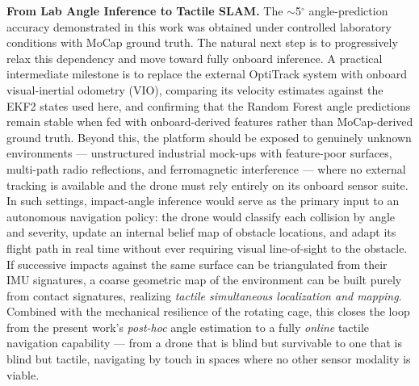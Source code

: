 \textbf{From Lab Angle Inference to Tactile SLAM.} The $\sim$5$^\circ$ angle-prediction accuracy demonstrated in this work was obtained under controlled laboratory conditions with MoCap ground truth. The natural next step is to progressively relax this dependency and move toward fully onboard inference. A practical intermediate milestone is to replace the external OptiTrack system with onboard visual-inertial odometry (VIO), comparing its velocity estimates against the EKF2 states used here, and confirming that the Random Forest angle predictions remain stable when fed with onboard-derived features rather than MoCap-derived ground truth. Beyond this, the platform should be exposed to genuinely unknown environments --- unstructured industrial mock-ups with feature-poor surfaces, multi-path radio reflections, and ferromagnetic interference --- where no external tracking is available and the drone must rely entirely on its onboard sensor suite. In such settings, impact-angle inference would serve as the primary input to an autonomous navigation policy: the drone would classify each collision by angle and severity, update an internal belief map of obstacle locations, and adapt its flight path in real time without ever requiring visual line-of-sight to the obstacle. If successive impacts against the same surface can be triangulated from their IMU signatures, a coarse geometric map of the environment can be built purely from contact signatures, realizing \emph{tactile simultaneous localization and mapping}. Combined with the mechanical resilience of the rotating cage, this closes the loop from the present work's \emph{post-hoc} angle estimation to a fully \emph{online} tactile navigation capability --- from a drone that is blind but survivable to one that is blind but tactile, navigating by touch in spaces where no other sensor modality is viable.

